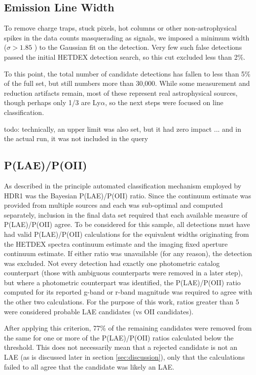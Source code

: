 \documentclass{aastex62}
\begin{document}
\subsection{Emission Line Width}
To remove charge traps, stuck pixels, hot columns or other non-astrophysical spikes in the data counts masquerading as signals, we imposed a minimum width ($\sigma > 1.85$ ) to the Gaussian fit on the detection. Very few such false detections passed the initial HETDEX detection search, so this cut excluded less than 2\%. 

To this point, the total number of candidate detections has fallen to less than 5\% of the full set, but still numbers more than 30,000. While some measurement and reduction artifacts remain, most of these represent real astrophysical sources, though perhaps only 1/3 are Ly$\alpha$, so the next steps were focused on line classification. 

{ \color{red} todo: technically, an upper limit was also set, but it had zero impact ... and in the actual run, it was not included in the query}


\subsection{P(LAE)/P(OII)}

As described in \cite{Leung} the principle automated classification mechanism employed by HDR1 was the Bayesian P(LAE)/P(OII) ratio. Since the continuum estimate was provided from multiple sources and each was sub-optimal and computed separately, inclusion in the final data set required that each available measure of P(LAE)/P(OII) agree. To be considered for this sample, all detections must have had valid P(LAE)/P(OII) calculations for the equivalent widths originating from the HETDEX spectra continuum estimate and the imaging fixed aperture continuum estimate. If either ratio was unavailable (for any reason), the detection was excluded. Not every detection had exactly one photometric catalog counterpart (those with ambiguous counterparts were removed in a later step), but where a photometric counterpart was identified, the P(LAE)/P(OII) ratio computed for its reported g-band or r-band magnitude was required to agree with the other two calculations. For the purpose of this work, ratios greater than 5 were considered probable LAE candidates (vs OII candidates).

After applying this criterion, 77\% of the remaining candidates were removed from the same for one or more of the P(LAE)/P(OII) ratios calculated below the threshold. This does not necessarily mean that a rejected candidate is not an LAE (as is discussed later in section \ref{sec:discussion}), only that the calculations failed to all agree that the candidate was likely an LAE.
\end{document}
